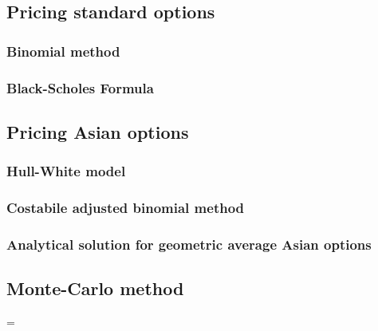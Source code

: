 \subsection{Pricing standard options}

\subsubsection{Binomial method}

\subsubsection{Black-Scholes Formula}

\subsection{Pricing Asian options}

\subsubsection{Hull-White model}

\subsubsection{Costabile adjusted binomial method}

\subsubsection{Analytical solution for geometric average Asian options}

\subsection{Monte-Carlo method}=